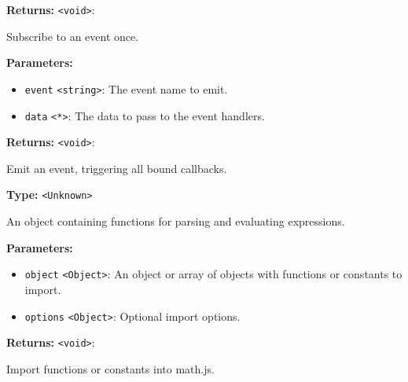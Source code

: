\documentclass[12pt,a4paper]{article}
\begin{document}
\noindent \textbf{Returns:} \texttt{<void>}: 

\noindent Subscribe to an event once.

\vspace{5mm}
\noindent {}


\noindent \textbf{Parameters:}
\begin{itemize}
  \item \texttt{event} \texttt{<string>}: The event name to emit.
  \item \texttt{data} \texttt{<*>}: The data to pass to the event handlers.
\end{itemize}

\noindent \textbf{Returns:} \texttt{<void>}: 

\noindent Emit an event, triggering all bound callbacks.

\vspace{5mm}
\noindent {}\vspace{4mm}


\noindent \textbf{Type:} \texttt{<Unknown>}

\noindent An object containing functions for parsing and evaluating expressions.

\vspace{5mm}
\noindent {}


\noindent \textbf{Parameters:}
\begin{itemize}
  \item \texttt{object} \texttt{<Object>}: An object or array of objects with functions or constants to import.
  \item \texttt{options} \texttt{<Object>}: Optional import options.
\end{itemize}

\noindent \textbf{Returns:} \texttt{<void>}: 

\noindent Import functions or constants into math.js.

\vspace{5mm}
\noindent {}
\end{document}
